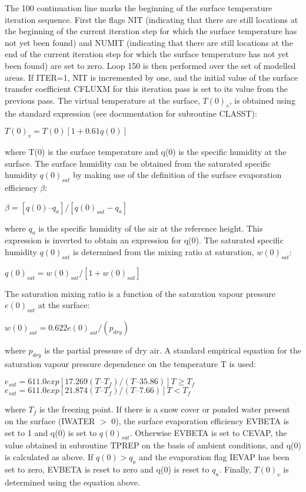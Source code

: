 The 100 continuation line marks the beginning of the surface temperature iteration sequence. First the flags N\+I\+T (indicating that there are still locations at the beginning of the current iteration step for which the surface temperature has not yet been found) and N\+U\+M\+I\+T (indicating that there are still locations at the end of the current iteration step for which the surface temperature has not yet been found) are set to zero. Loop 150 is then performed over the set of modelled areas. If I\+T\+E\+R=1, N\+I\+T is incremented by one, and the initial value of the surface transfer coefficient C\+F\+L\+U\+X\+M for this iteration pass is set to its value from the previous pass. The virtual temperature at the surface, $T(0)_v$, is obtained using the standard expression (see documentation for subroutine C\+L\+A\+S\+S\+T)\+:

$T(0)_v = T(0) [1 + 0.61 q(0)]$

where T(0) is the surface temperature and q(0) is the specific humidity at the surface. The surface humidity can be obtained from the saturated specific humidity $q(0)_{sat}$ by making use of the definition of the surface evaporation efficiency $\beta$\+:

$\beta = [q(0) – q_a]/[q(0)_{sat} - q_a]$

where $q_a$ is the specific humidity of the air at the reference height. This expression is inverted to obtain an expression for q(0). The saturated specific humidity $q(0)_{sat}$ is determined from the mixing ratio at saturation, $w(0)_{sat}$\+:

$q(0)_{sat} = w(0)_{sat}/[1 + w(0)_{sat}]$

The saturation mixing ratio is a function of the saturation vapour pressure $e(0)_{sat}$ at the surface\+:

$w(0)_{sat} = 0.622 e(0)_{sat}/(p_{dry})$

where $p_{dry}$ is the partial pressure of dry air. A standard empirical equation for the saturation vapour pressure dependence on the temperature T is used\+:

$e_{sat} = 611.0 exp[17.269 (T – T_f)/(T – 35.86)] T \geq T_f$ $e_{sat} = 611.0 exp[21.874 (T – T_f)/(T – 7.66)] T < T_f$

where $T_f$ is the freezing point. If there is a snow cover or ponded water present on the surface (I\+W\+A\+T\+E\+R $>$ 0), the surface evaporation efficiency E\+V\+B\+E\+T\+A is set to 1 and q(0) is set to $q(0)_{sat}$. Otherwise E\+V\+B\+E\+T\+A is set to C\+E\+V\+A\+P, the value obtained in subroutine T\+P\+R\+E\+P on the basis of ambient conditions, and q(0) is calculated as above. If $q(0) > q_a$ and the evaporation flag I\+E\+V\+A\+P has been set to zero, E\+V\+B\+E\+T\+A is reset to zero and q(0) is reset to $q_a$. Finally, $T(0)_v$ is determined using the equation above.

